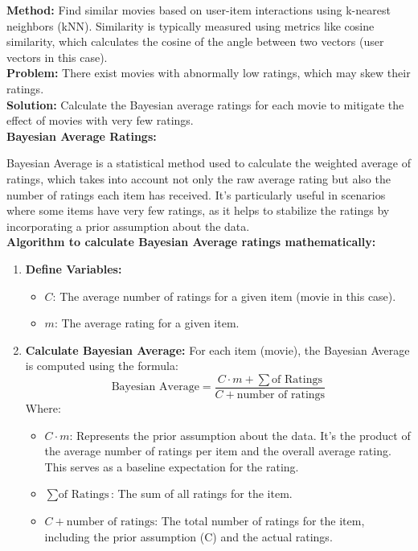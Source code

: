 \documentclass[a4paper]{article}
\theoremstyle{plain}
\theoremstyle{definition}
\begin{document}
    \textbf{Method:} Find similar movies based on user-item interactions using k-nearest neighbors (kNN). Similarity is typically measured using metrics like cosine similarity, which calculates the cosine of the angle between two vectors (user vectors in this case).\\

    \textbf{Problem:} There exist movies with abnormally low ratings, which may skew their ratings.\\

    \textbf{Solution:} Calculate the Bayesian average ratings for each movie to mitigate the effect of movies with very few ratings.\\

    \textbf{Bayesian Average Ratings:}

    Bayesian Average is a statistical method used to calculate the weighted average of ratings, which takes into account not only the raw average rating but also the number of ratings each item has received. It's particularly useful in scenarios where some items have very few ratings, as it helps to stabilize the ratings by incorporating a prior assumption about the data.\\

    \textbf{Algorithm to calculate Bayesian Average ratings mathematically:}

        \begin{enumerate}
            \item \textbf{Define Variables:}
            \begin{itemize}
                \item \( C \): The average number of ratings for a given item (movie in this case).
                \item \( m \): The average rating for a given item.
            \end{itemize}
            \item \textbf{Calculate Bayesian Average:}
            For each item (movie), the Bayesian Average is computed using the formula:
            \[
            \text{Bayesian Average} = \frac{{C \cdot m + \sum \text{of Ratings}}}{{C + \text{number of ratings}}}
            \]
            Where:
            \begin{itemize}
                \item \( C \cdot m \): Represents the prior assumption about the data. It's the product of the average number of ratings per item and the overall average rating. This serves as a baseline expectation for the rating.
                \item \( \sum \text{of Ratings} \): The sum of all ratings for the item.
                \item \( C + \text{number of ratings} \): The total number of ratings for the item, including the prior assumption (C) and the actual ratings.
            \end{itemize}
        \end{enumerate}
        
\end{document}
